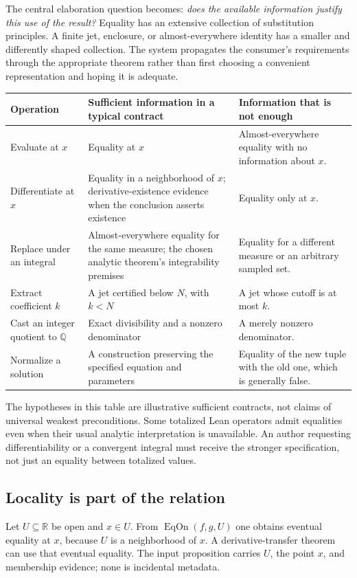 \documentclass[11pt,a4paper]{article}
\newcommand{\Q}{\mathbb Q}\newcommand{\R}{\mathbb R}
\newcommand{\EqOn}{\operatorname{EqOn}}
\theoremstyle{plain}\newtheorem{proposition}{Proposition}[section]
\theoremstyle{definition}\newtheorem{definition}[proposition]{Definition}
\theoremstyle{remark}\newtheorem{remark}[proposition]{Remark}
\begin{document}
The central elaboration question becomes: \emph{does the available information justify this use of the result?} Equality has an extensive collection of substitution principles. A finite jet, enclosure, or almost-everywhere identity has a smaller and differently shaped collection. The system propagates the consumer's requirements through the appropriate theorem rather than first choosing a convenient representation and hoping it is adequate.

\begin{center}\small
\begin{tabularx}{\textwidth}{@{}P{.22\textwidth}P{.35\textwidth}Y@{}}
\toprule
Operation & Sufficient information in a typical contract & Information that is not enough\\
\midrule
Evaluate at \(x\) & Equality at \(x\) & Almost-everywhere equality with no information about \(x\).\\
Differentiate at \(x\) & Equality in a neighborhood of \(x\); derivative-existence evidence when the conclusion asserts existence & Equality only at \(x\).\\
Replace under an integral & Almost-everywhere equality for the same measure; the chosen analytic theorem's integrability premises & Equality for a different measure or an arbitrary sampled set.\\
Extract coefficient \(k\) & A jet certified below \(N\), with \(k<N\) & A jet whose cutoff is at most \(k\).\\
Cast an integer quotient to \(\Q\) & Exact divisibility and a nonzero denominator & A merely nonzero denominator.\\
Normalize a solution & A construction preserving the specified equation and parameters & Equality of the new tuple with the old one, which is generally false.\\
\bottomrule
\end{tabularx}
\end{center}

The hypotheses in this table are illustrative sufficient contracts, not claims of universal weakest preconditions. Some totalized Lean operators admit equalities even when their usual analytic interpretation is unavailable. An author requesting differentiability or a convergent integral must receive the stronger specification, not just an equality between totalized values.

\subsection{Locality is part of the relation}
Let \(U\subseteq\R\) be open and \(x\in U\). From \(\EqOn(f,g,U)\) one obtains eventual equality at \(x\), because \(U\) is a neighborhood of \(x\). A derivative-transfer theorem can use that eventual equality. The input proposition carries \(U\), the point \(x\), and membership evidence; none is incidental metadata.
\end{document}
